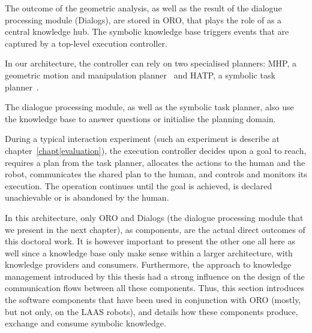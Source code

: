 The outcome of the geometric analysis, as well as the result of the dialogue
processing module ({\sc Dialogs}), are stored in ORO, that plays the role of as
a central knowledge hub. The symbolic knowledge base triggers events that are
captured by a top-level execution controller.

In our architecture, the controller can rely on two specialised planners: MHP,
a geometric motion and manipulation planner~\cite{Sisbot2008, Mainprice2011,
Pandey2010} and HATP, a symbolic task planner~\cite{Alili2009}.

The dialogue processing module, as well as the symbolic task planner, also use
the knowledge base to answer questions or initialise the planning domain.

During a typical interaction experiment (such an experiment is describe at
chapter~\ref{chapt|evaluation}), the execution controller decides upon a goal
to reach, requires a plan from the task planner, allocates the actions to the
human and the robot, communicates the shared plan to the human, and controls
and monitors its execution. The operation continues until the goal is achieved,
is declared unachievable or is abandoned by the human.

In this architecture, only ORO and Dialogs (the dialogue processing module that
we present in the next chapter), as components, are the actual direct outcomes
of this doctoral work. It is however important to present the other one all
here as well since a knowledge base only make sense within a larger
architecture, with knowledge providers and consumers.  Furthermore, the
approach to knowledge management introduced by this thesis had a strong
influence on the design of the communication flows between all these
components. Thus, this section introduces the software components that have
been used in conjunction with ORO (mostly, but not only, on the LAAS robots),
and details how these components produce, exchange and consume symbolic
knowledge.


